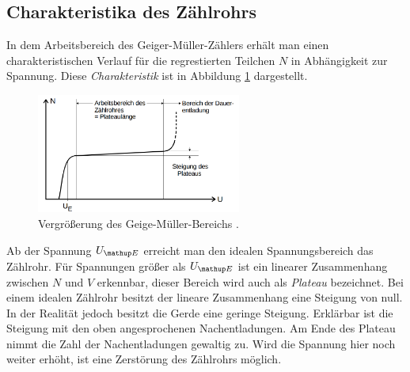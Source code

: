 \subsection{Charakteristika des Zählrohrs}
In dem Arbeitsbereich des Geiger-Müller-Zählers erhält man einen
charakteristischen Verlauf für die regrestierten Teilchen $N$ in Abhängigkeit zur Spannung.
Diese \emph{Charakteristik} ist in Abbildung \ref{fig: plateau} dargestellt.
\begin{figure}
  \centering
  \includegraphics[width=0.6\textwidth]{bilder/pleateu.png}
  \caption{Vergrößerung des Geige-Müller-Bereichs \cite{anleitung703}.}
  \label{fig: plateau}
\end{figure}
Ab der Spannung $U\ua{E}$ erreicht man den idealen Spannungsbereich das Zählrohr.
Für Spannungen größer als $U\ua{E}$ ist ein
linearer Zusammenhang zwischen $N$ und $V$ erkennbar, dieser Bereich wird auch als
\emph{Plateau} bezeichnet. Bei einem idealen Zählrohr besitzt der
lineare Zusammenhang eine Steigung von null. In der Realität jedoch besitzt
die Gerde eine geringe Steigung. Erklärbar ist die Steigung mit den oben angesprochenen Nachentladungen.
Am Ende des Plateau nimmt die
Zahl der Nachentladungen gewaltig zu. Wird die Spannung hier noch weiter erhöht,
ist eine Zerstörung des Zählrohrs möglich.
